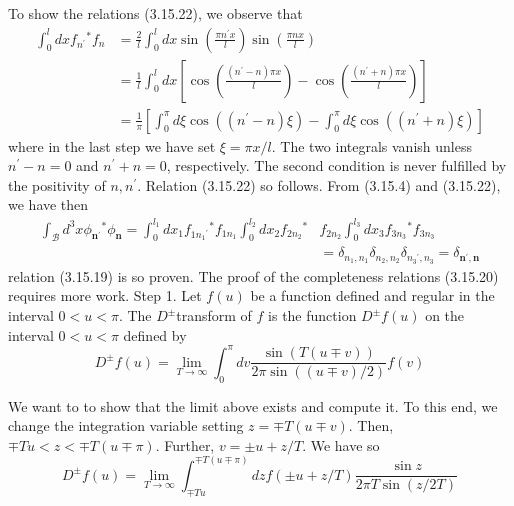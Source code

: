 \documentclass{article}
\begin{document}
To show the relations (3.15.22), we observe that
$$
\begin{align*}
\int_{0}^{l} d x f_{n^{\prime}}{ }^{*} f_{n} & =\frac{2}{l} \int_{0}^{l} d x \sin \left(\frac{\pi n^{\prime} x}{l}\right) \sin \left(\frac{\pi n x}{l}\right)  \tag{3.15.23}\\
& =\frac{1}{l} \int_{0}^{l} d x\left[\cos \left(\frac{\left(n^{\prime}-n\right) \pi x}{l}\right)-\cos \left(\frac{\left(n^{\prime}+n\right) \pi x}{l}\right)\right] \\
& =\frac{1}{\pi}\left[\int_{0}^{\pi} d \xi \cos \left(\left(n^{\prime}-n\right) \xi\right)-\int_{0}^{\pi} d \xi \cos \left(\left(n^{\prime}+n\right) \xi\right)\right]
\end{align*}
$$
where in the last step we have set $\xi=\pi x / l$. The two integrals vanish unless $n^{\prime}-n=0$ and $n^{\prime}+n=0$, respectively. The second condition is never fulfilled by the positivity of $n, n^{\prime}$. Relation (3.15.22) so follows. From (3.15.4) and (3.15.22), we have then
$$
\begin{align*}
\int_{\mathcal{B}} d^{3} x \phi_{\boldsymbol{n}^{\prime}}{ }^{*} \phi_{\boldsymbol{n}}=\int_{0}^{l_{1}} d x_{1} f_{1 n_{1}{ }^{\prime}}{ }^{*} f_{1 n_{1}} \int_{0}^{l_{2}} d x_{2} f_{2 n_{2}}{ }^{*} & f_{2 n_{2}} \int_{0}^{l_{3}} d x_{3} f_{3 n_{3}}{ }^{*} f_{3 n_{3}}  \tag{3.15.24}\\
& =\delta_{n_{1}, n_{1}} \delta_{n_{2}, n_{2}} \delta_{n_{3}{ }^{\prime}, n_{3}}=\delta_{\boldsymbol{n}^{\prime}, \boldsymbol{n}}
\end{align*}
$$
relation (3.15.19) is so proven.
The proof of the completeness relations (3.15.20) requires more work.
Step 1. Let $f(u)$ be a function defined and regular in the interval $0<u<\pi$. The $D^{ \pm}$transform of $f$ is the function $D^{ \pm} f(u)$ on the interval $0<u<\pi$ defined by
$$
\begin{equation*}
D^{ \pm} f(u)=\lim _{T \rightarrow \infty} \int_{0}^{\pi} d v \frac{\sin (T(u \mp v))}{2 \pi \sin ((u \mp v) / 2)} f(v) \tag{3.15.25}
\end{equation*}
$$

We want to to show that the limit above exists and compute it. To this end, we change the integration variable setting $z=\mp T(u \mp v)$. Then, $\mp T u<z<\mp T(u \mp \pi)$. Further, $v= \pm u+z / T$. We have so
$$
\begin{equation*}
D^{ \pm} f(u)=\lim _{T \rightarrow \infty} \int_{\mp T u}^{\mp T(u \mp \pi)} d z f( \pm u+z / T) \frac{\sin z}{2 \pi T \sin (z / 2 T)} \tag{3.15.26}
\end{equation*}
$$
\end{document}
